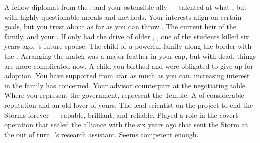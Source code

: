 \documentclass[char]{GL2020}
\begin{document}
\begin{contacts}
    \contact{\cEvil{}} A fellow diplomat from the \pFarm{}, and your ostensible ally — talented at what \cEvil{\they} \cEvil{\do}, but with highly questionable morals and methods. Your interests align on certain goals, but you trust \cEvil{\them} about as far as you can throw \cEvil{\them}.
    \contact{\cHeir{}} The current heir of the \cHeir{\formal} family, and your \cHeir{\nibling}. If only \cHeir{\they} had the drive of \cHeir{\their} older \cHeirSibling{\sibling}, \cHeirSibling{}, one of the students killed six years ago.
    \contact{\cChupStudent{}} \cHeir{}'s future spouse. The child of a powerful \pFarm{} family along the border with the \pTech{}. Arranging the match was a major feather in your cap, but with \cHeirSibling{} dead, things are more complicated now.
    \contact{\cAmbition{}} A child you birthed and were obligated to give up for adoption. You have supported \cAmbition{\them} from afar as much as you can. \cAmbition{\Their} increasing interest in the \cHeir{\formal} family has \cFaledonParent{} concerned.
     \contact{\cAntiChup{}} Your advisor counterpart at the negotiating table. Where you represent the government, \cAntiChup{\they} represent\cAntiChup{\verbs} the Temple. A \cAntiChup{\cleric} of considerable reputation and an old lover of yours.
    \contact{\cHeadScientist{}} The lead scientist on the project to end the Storms forever — capable, brilliant, and reliable. Played a role in the covert operation that sealed the alliance with the \pFarm{} six years ago that sent the Storm at the \pShip{} out of turn.
    \contact{\cAssistantScientist{}} \cHeadScientist{}'s research assistant. Seems competent enough.
\end{contacts}
\end{document}
